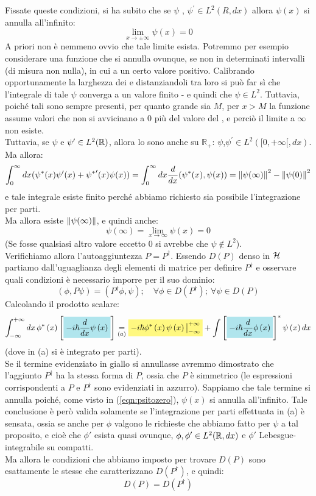 \documentclass[../../FisicaTeorica.tex]{subfiles}
\begin{document}
Fissate queste condizioni, si ha subito che se $\psi$ , $\psi^\prime\in L^2(R, dx)$ allora $\psi(x)$ si annulla all'infinito:
\[
\lim_{x\rightarrow\pm\infty}{\psi\left(x\right)}=0
\]
A priori non è nemmeno ovvio che tale limite esista. Potremmo per esempio considerare una funzione che si annulla ovunque, se non in determinati intervalli (di misura non nulla), in cui  a un certo valore positivo. Calibrando opportunamente la larghezza dei  e distanziandoli tra loro si può far sì che l'integrale di tale $\psi$ converga a un valore finito - e quindi che $\psi \in L^2$. Tuttavia, poiché tali  sono sempre presenti, per quanto grande sia $M$, per $x>M$ la funzione assume valori che non si avvicinano a $0$ più del valore del , e perciò il limite a $\infty$ non esiste.\\
Tuttavia, se $\psi$ e $\psi' \in L^2(\mathbb{R})$, allora lo sono anche su $\mathbb{R}_+$: $\psi$,$\psi^\prime\in L^2([0, +\infty [, dx)$. Ma allora:
\[
\int_0^\infty dx (\psi^*(x)\psi'(x)+{\psi^*}'(x)\psi(x)) = \int_0^\infty dx \frac{d}{dx}(\psi^*(x), \psi(x)) = \left\lVert\psi(\infty)\right\rVert^2 - \left\lVert\psi(0)\right\rVert^2
\]
e tale integrale esiste finito perché abbiamo richiesto sia possibile l'integrazione per parti.\\
Ma allora esiste $\left\lVert\psi(\infty)\right\rVert$, e quindi anche:
\begin{equation}
\psi(\infty) = \lim_{x\to\infty} \psi(x) = 0
\label{eqn:psitozero}
\end{equation}
(Se fosse qualsiasi altro valore eccetto $0$ si avrebbe che $\psi \notin L^2$).\\

Verifichiamo allora l'autoaggiuntezza $P = P^\dag$. Essendo $D(P)$ denso in $\mathcal{H}$ partiamo dall'uguaglianza degli elementi di matrice per definire $P^\dag$ e osservare quali condizioni è necessario imporre per il suo dominio:
\[
\left(\phi,P\psi\right)=(P^\dag\phi,\psi); \quad \forall \phi \in D(P^\dag);\> \forall \psi \in D(P)
\]
Calcolando il prodotto scalare:
\[
\int_{-\infty}^{+\infty}{dx\,\phi^\ast\left(x\right)\left[\hlc{SkyBlue}{-i\hbar\frac{d}{dx}\psi\left(x\right)}\right]\underset{(a)}{=}
\hlc{Yellow}{-i\hbar\phi^\ast\left(x\right)\psi\left(x\right)\big|_{-\infty}^{+\infty}}+\int{\left[\hlc{SkyBlue}{-i\hbar\frac{d}{dx}\phi\left(x\right)}\right]^\ast\psi\left(x\right)dx}}
\]
(dove in (a) si è integrato per parti).\\
Se il termine evidenziato in giallo si annullasse avremmo dimostrato che l'aggiunto $P^\dag$ ha la stessa forma di $P$, ossia che $P$ è simmetrico (le espressioni corrispondenti a $P$ e $P^\dag$ sono evidenziati in azzurro). Sappiamo che tale termine si annulla poiché, come visto in (\ref{eqn:psitozero}), $\psi(x)$ si annulla all'infinito. Tale conclusione è però valida solamente se l'integrazione per parti effettuata in (a) è sensata, ossia se anche per $\phi$ valgono le richieste che abbiamo fatto per $\psi$ a tal proposito, e cioè che $\phi'$ esista quasi ovunque, $\phi, \phi' \in L^2(\mathbb{R},dx)$ e $\phi'$ Lebesgue-integrabile su compatti.\\
Ma allora le condizioni che abbiamo imposto per trovare $D(P)$ sono esattamente le stesse che caratterizzano $D\left(P^\dag\right)$, e quindi:
\[
D\left(P\right)=D(P^\dag)
\]
\end{document}
